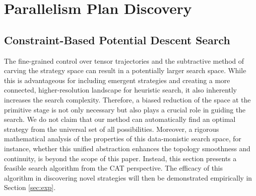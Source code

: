 \documentclass[letterpaper,twocolumn,10pt]{article}
\newcommand{\name}{CATFlow}
\begin{document}



\vspace{-.5em}
\section{Parallelism Plan Discovery}

\subsection{Constraint-Based Potential Descent Search}
\label{sec:search}

The fine-grained control over tensor trajectories and the subtractive method of carving the strategy space can result in a potentially larger search space. While this is advantageous for including emergent strategies and creating a more connected, higher-resolution landscape for heuristic search, it also inherently increases the search complexity. Therefore, a biased reduction of the space at the primitive stage is not only necessary but also plays a crucial role in guiding the search. We do not claim that our method can automatically find an optimal strategy from the universal set of all possibilities. Moreover, a rigorous mathematical analysis of the properties of this data-monistic search space, for instance, whether this unified abstraction enhances the topology smoothness and continuity, is beyond the scope of this paper. Instead, this section presents a feasible search algorithm from the CAT perspective. The efficacy of this algorithm in discovering novel strategies will then be demonstrated empirically in Section \ref{sec:exp}.
\end{document}
